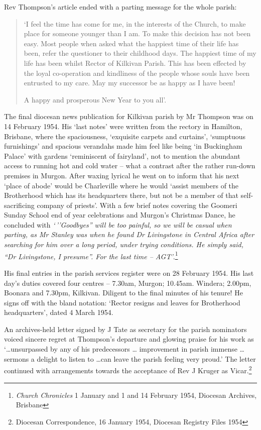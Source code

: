 Rev Thompson's article ended with a parting message for the whole
parish:

\begin{quote}
`I feel the time has come for me, in the interests of the Church, to
make place for someone younger than I am. To make this decision has not
been easy. Most people when asked what the happiest time of their life
has been, refer the questioner to their childhood days. The happiest
time of my life has been whilst Rector of Kilkivan Parish. This has been
effected by the loyal co-operation and kindliness of the people whose
souls have been entrusted to my care. May my successor be as happy as I
have been!

A happy and prosperous New Year to you all'.
\end{quote}

The final diocesan news publication for Kilkivan parish by Mr Thompson
was on 14 February 1954. His `last notes' were written from the rectory
in Hamilton, Brisbane, where the spaciousness, `exquisite carpets and
curtains', `sumptuous furnishings' and spacious verandahs made him feel
like being `in Buckingham Palace' with gardens `reminiscent of
fairyland', not to mention the abundant access to running hot and cold
water -- what a contrast after the rather run-down premises in Murgon.
After waxing lyrical he went on to inform that his next `place of abode'
would be Charleville where he would `assist members of the Brotherhood
which has its headquarters there, but not be a member of that
self-sacrificing company of priests'. With a few brief notes covering
the Goomeri Sunday School end of year celebrations and Murgon's
Christmas Dance, he concluded with \emph{`\,''Goodbyes'' will be too
painful, so we will be casual when parting, as Mr Stanley was when he
found Dr Livingstone in Central Africa after searching for him over a
long period, under trying conditions. He simply said, ``Dr Livingstone,
I presume''. For the last time -- AGT'}.\footnote{\emph{Church
  Chronicles} 1 January and 1 and 14 February 1954, Diocesan Archives,
  Brisbane}

His final entries in the parish services register were on 28 February
1954. His last day's duties covered four centres -- 7.30am, Murgon;
10.45am. Windera; 2.00pm, Boonara and 7.30pm, Kilkivan. Diligent to the
final minutes of his tenure! He signs off with the bland notation:
`Rector resigns and leaves for Brotherhood headquarters', dated 4 March
1954.

An archives-held letter signed by J Tate as secretary for the parish
nominators voiced sincere regret at Thompson's departure and glowing
praise for his work as `\ldots unsurpassed by any of his predecessors
\ldots{} improvement in parish immense \ldots{} sermons a delight to
listen to \ldots can leave the parish feeling very proud.' The letter
continued with arrangements towards the acceptance of Rev J Kruger as
Vicar.\footnote{Diocesan Correspondence, 16 January 1954, Diocesan
  Registry Files 1954}

